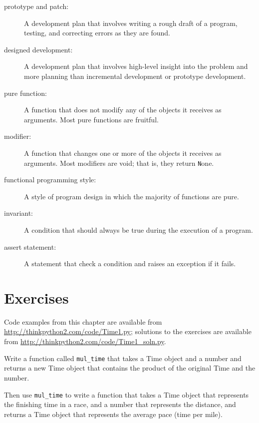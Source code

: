 \documentclass[
DIV=11,
fontsize=13,
twoside,
headinclude=false,
titlepage=firstiscover,
abstract=true,
headsepline=true,
footsepline=true,
chapterprefix=true, %
headings=big,
bibliography=totoc,%
captions=tableheading
]{scrbook}
\theoremstyle{definition}
\begin{document}
\begin{description}

\item[prototype and patch:] A development plan that involves
writing a rough draft of a program, testing, and correcting errors as
they are found.

\item[designed development:] A development plan that involves
high-level insight into the problem and more planning than incremental
development or prototype development.

\item[pure function:] A function that does not modify any of the objects it
receives as arguments.  Most pure functions are fruitful.

\item[modifier:] A function that changes one or more of the objects it
  receives as arguments.  Most modifiers are void; that is, they
  return {\texttt None}.  

\item[functional programming style:] A style of program design in which the
majority of functions are pure.

\item[invariant:] A condition that should always be true during the
execution of a program.

\item[assert statement:] A statement that check a condition and raises
an exception if it fails.

\end{description}


\section{Exercises}

Code examples from this chapter are available from
\url{http://thinkpython2.com/code/Time1.py}; solutions to the
exercises are available from \url{http://thinkpython2.com/code/Time1_soln.py}.

\begin{exercise}
\normalfont

Write a function called \verb"mul_time" that takes a Time object
and a number and returns a new Time object that contains
the product of the original Time and the number.

Then use \verb"mul_time" to write a function that takes a Time
object that represents the finishing time in a race, and a number
that represents the distance, and returns a Time object that represents
the average pace (time per mile).

\end{exercise}
\end{document}
